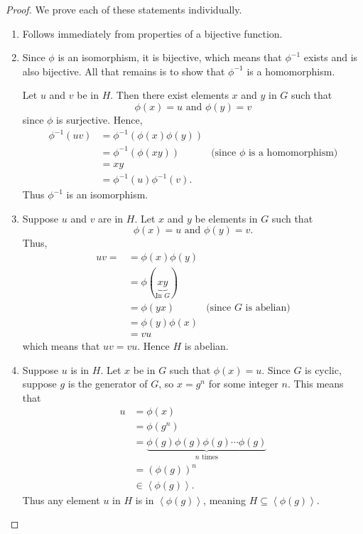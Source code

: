 \begin{proof}
    We prove each of these statements individually.
    \begin{enumerate}
        \item Follows immediately from properties of a bijective function.

        \item Since $\phi$ is an isomorphism, it is bijective, which means that $\phi^{-1}$ exists and is also bijective. All that remains is to show that $\phi^{-1}$ is a homomorphism.

        Let $u$ and $v$ be in $H$. Then there exist elements $x$ and $y$ in $G$ such that
        \[
            \phi(x) = u \text{ and } \phi(y) = v
        \]
        since $\phi$ is surjective. Hence,
        \begin{align*}
            \phi^{-1}(uv) &= \phi^{-1}\left(\phi(x)\phi(y)\right)\\
            &= \phi^{-1}\left(\phi(xy)\right) & \text{(since } \phi \text{ is a homomorphism)}\\
            &= xy\\
            &= \phi^{-1}(u) \phi^{-1}(v).
        \end{align*}
        Thus $\phi^{-1}$ is an isomorphism.

        \item Suppose $u$ and $v$ are in $H$. Let $x$ and $y$ be elements in $G$ such that
        \[
            \phi(x) = u \text{ and } \phi(y) = v.
        \]
        Thus,
        \begin{align*}
            uv = &= \phi(x)\phi(y) \\
            &= \phi(\underbrace{xy}_{\text{In } G})\\
            &= \phi(yx) & \text{(since } G \text{ is abelian)}\\
            &= \phi(y)\phi(x)\\
            &= vu
        \end{align*}
        which means that $uv = vu$. Hence $H$ is abelian.

        \item Suppose $u$ is in $H$. Let $x$ be in $G$ such that $\phi(x) = u$. Since $G$ is cyclic, suppose $g$ is the generator of $G$, so $x = g^n$ for some integer $n$. This means that
        \begin{align*}
            u &= \phi(x)\\
            &= \phi(g^n)\\
            &= \underbrace{\phi(g)\phi(g)\phi(g)\cdots\phi(g)}_{n \text{ times}}\\
            &= \left(\phi(g)\right)^n\\
            &\in \left\langle \phi(g) \right \rangle.
        \end{align*}
        Thus any element $u$ in $H$ is in $\left\langle \phi(g) \right \rangle$, meaning $H \subseteq \left\langle \phi(g) \right \rangle$.


\end{enumerate}
\end{proof}

